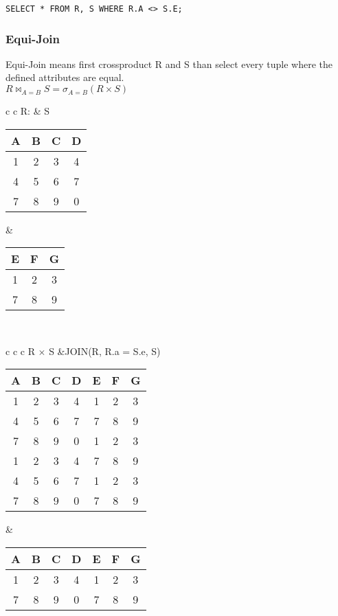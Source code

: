 \lstset{language=SQL,tabsize=4,captionpos=b,frame=single,
basicstyle=\footnotesize}
\begin{lstlisting}[caption=SQL NoEqui-Join]
SELECT * FROM R, S WHERE R.A <> S.E;
\end{lstlisting}

\subsubsection{Equi-Join}
Equi-Join means first crossproduct R and S than select every tuple where the
defined attributes are equal.\\
$R \bowtie_{A = B} S = \sigma_{A = B} (R \times S) $

\begin{tabular}{ c c}
	R: & S \\
	\begin{tabular}{|c|c|c|c|}
		\hline
		A & B & C & D\\
		\hline
		1 & 2 & 3 & 4\\
		\hline
		4 & 5 & 6 & 7\\
		\hline
		7 & 8 & 9 & 0\\
		\hline
	\end{tabular} &

	\begin{tabular}{|c|c|c|}
		\hline
		E & F & G \\
		\hline
		1 & 2 & 3\\
		\hline
		7 & 8 & 9\\
		\hline
	\end{tabular}
\end{tabular}\\

\hspace{-0.5cm}
\begin{tabular}{ c c c }
	R $\times$ S &JOIN(R, R.a = S.e, S)\\
	\begin{tabular}{|c|c|c|c|c|c|c|}
		\hline
		A & B & C & D & E & F & G\\
		\hline
		1 & 2 & 3 & 4 & 1 & 2 & 3\\
		\hline
		4 & 5 & 6 & 7 & 7 & 8 & 9\\
		\hline
		7 & 8 & 9 & 0 & 1 & 2 & 3\\
		\hline                     
		1 & 2 & 3 & 4 & 7 & 8 & 9\\
		\hline
		4 & 5 & 6 & 7 & 1 & 2 & 3\\
		\hline                     
		7 & 8 & 9 & 0 & 7 & 8 & 9\\
		\hline
	\end{tabular} &

	\begin{tabular}{|c|c|c|c|c|c|c|}
		\hline
		A & B & C & D & E & F & G\\
		\hline
		1 & 2 & 3 & 4 & 1 & 2 & 3\\
		\hline
		7 & 8 & 9 & 0 & 7 & 8 & 9\\
		\hline
	\end{tabular} 
\end{tabular}\\

